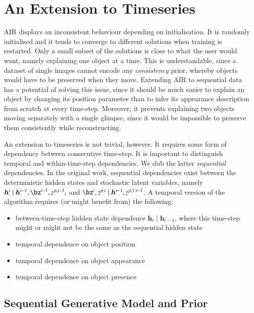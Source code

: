\section{An Extension to Timeseries}
AIR displays an inconsistent behaviour depending on initialisation. It is randomly initialised and it tends to converge to different solutions when training is restarted. Only a small subset of the solutions is close to what the user would want, namely explaining one object at a time. This is understandable, since a dataset of single images cannot encode any \emph{consistency} prior, whereby objects would have to be preserved when they move. Extending AIR to sequential data has a potential of solving this issue, since it should be much easier to explain an object by changing its position parameter than to infer its appearance description from scratch at every time-step. Moreover, it prevents explaining two objects moving separately with a single glimpse, since it would be impossible to preserve them consistently while reconstructing.

An extension to timeseries is not trivial, however. It requires some form of dependency between consecutive time-step. It is important to distinguish temporal and within-time-step dependencies. We dub the latter \emph{sequential} dependencies. In the original work, sequential dependencies exist between the deterministic hidden states and stochastic latent variables, namely $\bm{h}^i \mid \bm{h}^{i-1}, \bz^{i-1}, z^{p, i-1},$ and $\bz^i, z^{p, i} \mid \bm{h}^{i-1}, z^{p, 1:i-1}$. A temporal version of the algorithm requires (or might benefit from) the following:
\begin{itemize}
    \item between-time-step hidden state dependence \eg $\bm{h}_t \mid \bm{h}_{t-1}$, where this time-step might or might not be the same as the sequential hidden state
    \item temporal dependence on object position
    \item temporal dependence on object appearance
    \item temporal dependence on object presence
\end{itemize}

\subsection{Sequential Generative Model and Prior}

